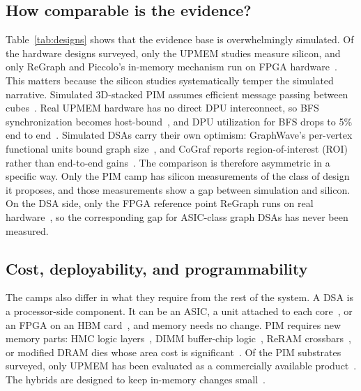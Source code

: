 \documentclass[journal,onecolumn]{IEEEtran}
\begin{document}
\subsection{How comparable is the evidence?}
Table~\ref{tab:designs} shows that the evidence base is overwhelmingly simulated. Of the hardware designs surveyed, only the UPMEM studies measure silicon, and only ReGraph and Piccolo's in-memory mechanism run on FPGA hardware~\cite{gomezluna2022prim,cai2024pimpam,barkhordar2025alphapim,asquini2025tc,chen2022regraph,shin2025piccolo}. This matters because the silicon studies systematically temper the simulated narrative. Simulated 3D-stacked PIM assumes efficient message passing between cubes~\cite{ahn2015tesseract,zhuo2019graphq}. Real UPMEM hardware has no direct DPU interconnect, so BFS synchronization becomes host-bound~\cite{gomezluna2022prim}, and DPU utilization for BFS drops to 5\% end to end~\cite{barkhordar2025alphapim}. Simulated DSAs carry their own optimism: GraphWave's per-vertex functional units bound graph size~\cite{lee2022graphwave}, and CoGraf reports region-of-interest (ROI) rather than end-to-end gains~\cite{yenimol2026cograf}. The comparison is therefore asymmetric in a specific way. Only the PIM camp has silicon measurements of the class of design it proposes, and those measurements show a gap between simulation and silicon. On the DSA side, only the FPGA reference point ReGraph runs on real hardware~\cite{chen2022regraph}, so the corresponding gap for ASIC-class graph DSAs has never been measured.

\subsection{Cost, deployability, and programmability}
The camps also differ in what they require from the rest of the system. A DSA is a processor-side component. It can be an ASIC, a unit attached to each core~\cite{mukkara2018hats,zhao2022tdgraph}, or an FPGA on an HBM card~\cite{chen2022regraph}, and memory needs no change. PIM requires new memory parts: HMC logic layers~\cite{ahn2015tesseract}, DIMM buffer-chip logic~\cite{talati2022ndminer}, ReRAM crossbars~\cite{song2018graphr}, or modified DRAM dies whose area cost is significant~\cite{shin2025fala}. Of the PIM substrates surveyed, only UPMEM has been evaluated as a commercially available product~\cite{gomezluna2022prim}. The hybrids are designed to keep in-memory changes small~\cite{shin2025piccolo,shin2025fala}.
\end{document}
